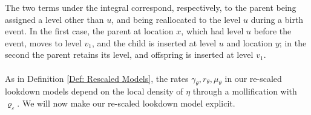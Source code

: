 \documentclass[12pt]{article}
\begin{document}
The two terms under the integral
correspond, respectively, to the parent being assigned 
a level other than $u$, and being reallocated to the level $u$ during a
birth event. In the first case, the parent at location $x$, which had level $u$ before the 
event, moves to level $v_1$, and the child is inserted at level $u$ and location $y$; in 
the second the parent retains its level, and offspring is inserted at
level $v_1$.\\~\\




As in Definition \ref{Def: Rescaled Models}, the rates $\gamma_{\theta},r_\theta, \mu_{\theta}$ in our re-scaled lookdown models  depend on the local density of $\eta$ through a mollification with $\varrho_{\varepsilon}$. We will now make our re-scaled lookdown model explicit.
\end{document}
